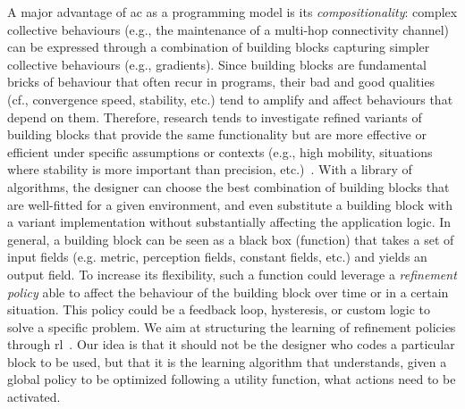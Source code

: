 A major advantage of \ac{ac} as a programming model is its \emph{compositionality}: complex collective behaviours (e.g., the maintenance of a multi-hop connectivity channel) can be expressed through a combination of building blocks capturing simpler collective behaviours (e.g., gradients).
%
Since building blocks are fundamental bricks of behaviour that often recur in programs, 
 their bad and good qualities (cf., convergence speed, stability, etc.) tend to amplify and affect behaviours that depend on them.
%
%
Therefore, research tends to investigate refined variants of building blocks that provide the same functionality but are more effective or efficient under specific assumptions or contexts (e.g., high mobility, situations where stability is more important than precision, etc.)~\cite{DBLP:conf/saso/AudritoCDV17,DBLP:journals/cee/AudritoCDPV21}.
%
With a library of algorithms, the designer can choose the best combination of building blocks that are well-fitted for a given environment, and even substitute a building block with a variant implementation without substantially affecting the application logic.
In general, a building block can be seen as a black box (function) that takes a set of input fields (e.g. metric, perception fields, constant fields, etc.) and yields an output field. 
%
To increase its flexibility, such a function could leverage a \emph{refinement policy} able to affect the behaviour of the building block over time or in a certain situation. 
%
This policy could be a feedback loop, hysteresis, or custom logic to solve a specific problem.
%
We aim at structuring the learning of refinement policies through \ac{rl}~\cite{DBLP:conf/acsos/Aguzzi21}.
%
Our idea is that it should not be the designer who codes a particular block to be used, but that it is the learning algorithm that understands, given a global policy to be optimized following a utility function, what actions need to be activated.

